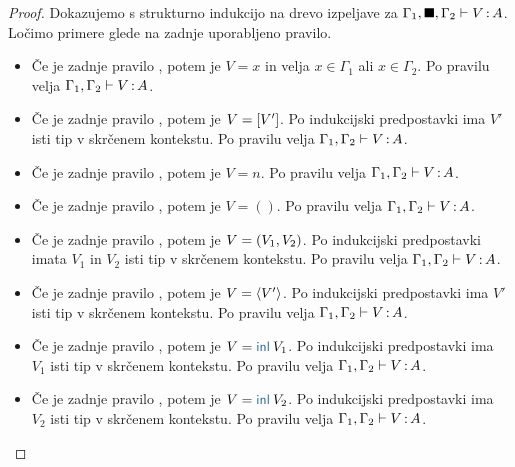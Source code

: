 \begin{proof}
	Dokazujemo s strukturno indukcijo na drevo izpeljave za $\Gamma_1, \blacksquare, \Gamma_2 \vdash V \mathinner{:} A$.
	Ločimo primere glede na zadnje uporabljeno pravilo.
	
	\begin{itemize}
		\item[\sitem] Če je zadnje pravilo , potem je $V = x$ in velja $x \in \Gamma_1$ ali $x \in \Gamma_2$.
		Po pravilu  velja $\Gamma_1, \Gamma_2 \vdash V \mathinner{:} A$.

		\item Če je zadnje pravilo , potem je $V = [V']$.
		Po indukcijski predpostavki ima $V'$ isti tip v skrčenem kontekstu.
		Po pravilu  velja $\Gamma_1, \Gamma_2 \vdash V \mathinner{:} A$.
		
		\item Če je zadnje pravilo , potem je $V = n$. Po pravilu  velja $\Gamma_1, \Gamma_2 \vdash V \mathinner{:} A$.
		
		\item Če je zadnje pravilo , potem je $V = ()$. Po pravilu  velja $\Gamma_1, \Gamma_2 \vdash V \mathinner{:} A$.
		
		\item Če je zadnje pravilo , potem je $V =( V_1 , V_2 )$.
		Po indukcijski predpostavki imata $V_1$ in $V_2$ isti tip v skrčenem kontekstu.
		Po pravilu  velja $\Gamma_1, \Gamma_2 \vdash V \mathinner{:} A$.
		
		\item Če je zadnje pravilo , potem je $V = \langle V' \rangle$.
		Po indukcijski predpostavki ima $V'$ isti tip v skrčenem kontekstu.
		Po pravilu  velja $\Gamma_1, \Gamma_2 \vdash V \mathinner{:} A$.
		
		\item Če je zadnje pravilo , potem je $V = \tminl{V_1}$.
		Po indukcijski predpostavki ima $V_1$ isti tip v skrčenem kontekstu.
		Po pravilu  velja $\Gamma_1, \Gamma_2 \vdash V \mathinner{:} A$.
		
		\item Če je zadnje pravilo , potem je $V = \tminl{V_2}$.
		Po indukcijski predpostavki ima $V_2$ isti tip v skrčenem kontekstu.
		Po pravilu  velja $\Gamma_1, \Gamma_2 \vdash V \mathinner{:} A$.
		

\end{itemize}
\end{proof}
